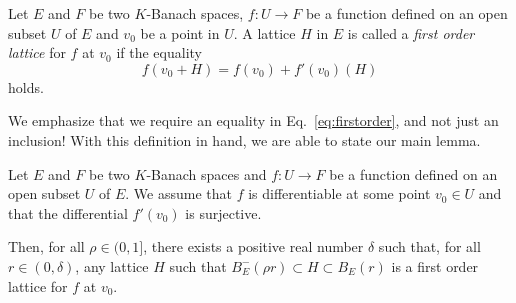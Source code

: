 \documentclass{lms}
\begin{document}
\begin{deftn}
\label{def:firstorder}
Let $E$ and $F$ be two $K$-Banach spaces, $f : U \rightarrow F$ be a 
function defined on an open subset $U$ of $E$ and $v_0$ be a 
point in $U$.
A lattice $H$ in $E$ is called a \emph{first order lattice} for $f$ at 
$v_0$ if the equality
\begin{equation}
\label{eq:firstorder}
f(v_0 + H) = f(v_0) + f'(v_0) (H)
\end{equation}
holds.
\end{deftn}

We emphasize that we require an equality in Eq.~\eqref{eq:firstorder}, 
and not just an inclusion! 
With this definition in hand, we are able to state our main lemma.

\begin{lem} \label{lem:main}
Let $E$ and $F$ be two $K$-Banach spaces and $f : U 
\rightarrow F$ be a function defined on an open subset $U$ of $E$.
We assume that $f$ is differentiable at some point $v_0 \in 
U$ and that the differential $f'(v_0)$ is surjective. 

Then, for all $\rho \in (0, 1]$, there exists a positive real 
number $\delta$ such that, for all $r \in (0, \delta)$, any lattice
$H$ such that $B^-_E(\rho r) \subset H \subset B_E(r)$ is a first
order lattice for $f$ at $v_0$.
\end{lem}
\end{document}

